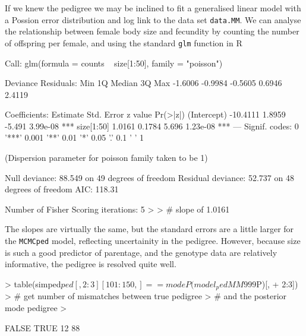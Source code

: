 \documentclass{article}
\begin{document}
 If we knew the pedigree we may be inclined to fit a generalised linear model with a Possion error distribution and log link to the data set \texttt{data.MM}.  We can analyse the relationship between female body size and fecundity by counting the number of offspring per female, and using the standard \texttt{glm} function in R 

\begin{Schunk}
\begin{Soutput}
Call:
glm(formula = counts ~ size[1:50], family = "poisson")

Deviance Residuals: 
    Min       1Q   Median       3Q      Max  
-1.6006  -0.9984  -0.5605   0.6946   2.4119  

Coefficients:
            Estimate Std. Error z value Pr(>|z|)    
(Intercept) -10.4111     1.8959  -5.491 3.99e-08 ***
size[1:50]    1.0161     0.1784   5.696 1.23e-08 ***
---
Signif. codes:  0 '***' 0.001 '**' 0.01 '*' 0.05 '.' 0.1 ' ' 1 

(Dispersion parameter for poisson family taken to be 1)

    Null deviance: 88.549  on 49  degrees of freedom
Residual deviance: 52.737  on 48  degrees of freedom
AIC: 118.31

Number of Fisher Scoring iterations: 5
>
> # slope of 1.0161
\end{Soutput}
\end{Schunk}

The slopes are virtually the same,  but the standard errors are a little larger for the \texttt{MCMCped} model, reflecting uncertainity in the pedigree.  However, because size is such a good predictor of parentage, and the genotype data are relatively informative, the pedigree is resolved quite well.

\begin{Schunk}
\begin{Sinput}
> table(simped$ped[, 2:3][101:150, ] == modeP(model_pedMM999$P)[, 
+     2:3])
> # get number of mismatches between true pedigree
> # and the posterior mode pedigree 
>
\end{Sinput}
\begin{Soutput}
FALSE  TRUE 
   12    88 
\end{Soutput}
\end{Schunk}
\end{document}
